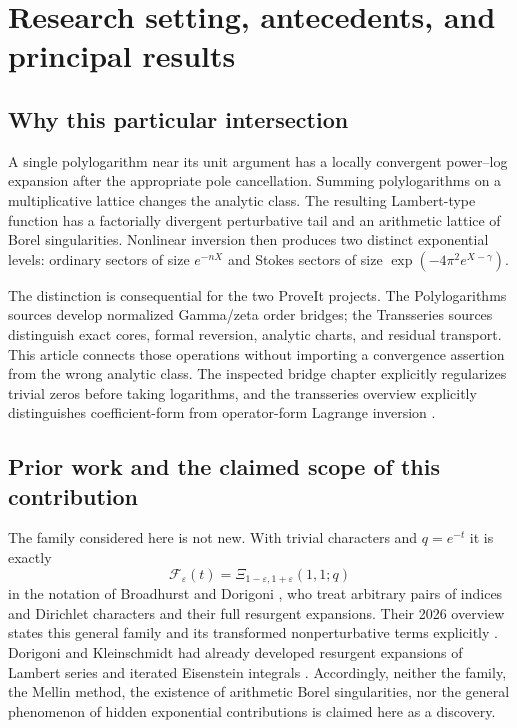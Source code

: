 \documentclass[11pt,a4paper]{article}
\numberwithin{equation}{section}
\theoremstyle{definition}\newtheorem{definition}[theorem]{Definition}
\theoremstyle{remark}\newtheorem{remark}[theorem]{Remark}
\newcommand{\eps}{\varepsilon}
\newcommand{\F}{\mathcal F}\newcommand{\CC}{\mathcal C}
\begin{document}
\section{Research setting, antecedents, and principal results}
\label{sec:intro}

\subsection{Why this particular intersection}
A single polylogarithm near its unit argument has a locally convergent
power--log expansion after the appropriate pole cancellation. Summing
polylogarithms on a multiplicative lattice changes the analytic class.
The resulting Lambert-type function has a factorially divergent
perturbative tail and an arithmetic lattice of Borel singularities.
Nonlinear inversion then produces two distinct exponential levels:
ordinary sectors of size $e^{-nX}$ and Stokes sectors of size
$\exp(-4\pi^2 e^{X-\gamma})$.

The distinction is consequential for the two ProveIt projects. The
Polylogarithms sources develop normalized Gamma/zeta order bridges; the
Transseries sources distinguish exact cores, formal reversion, analytic
charts, and residual transport. This article connects those operations
without importing a convergence assertion from the wrong analytic class.
The inspected bridge chapter explicitly regularizes trivial zeros before
taking logarithms, and the transseries overview explicitly distinguishes
coefficient-form from operator-form Lagrange inversion
\cite{repo-bridge,repo-transseries}.

\subsection{Prior work and the claimed scope of this contribution}
The family considered here is not new. With trivial characters and
$q=e^{-t}$ it is exactly
\[
 \F_\eps(t)=\Xi_{1-\eps,1+\eps}(1,1;q)
\]
in the notation of Broadhurst and Dorigoni \cite{BD2025}, who treat
arbitrary pairs of indices and Dirichlet characters and their full
resurgent expansions. Their 2026 overview states this general family and
its transformed nonperturbative terms explicitly \cite{BD2026}.
Dorigoni and Kleinschmidt had already developed resurgent expansions of
Lambert series and iterated Eisenstein integrals \cite{DK2021}.
Accordingly, neither the family, the Mellin method, the existence of
arithmetic Borel singularities, nor the general phenomenon of hidden
exponential contributions is claimed here as a discovery.
\end{document}
